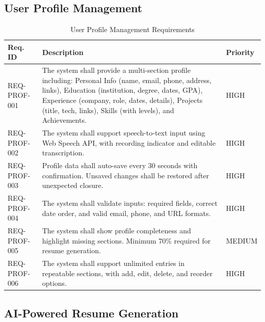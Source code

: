 \documentclass[12pt, a4paper, oneside]{report}
\begin{document}
\subsection{User Profile Management}

\begin{table}[H]
\centering
\caption{User Profile Management Requirements}
\label{tab:req_profile}
\renewcommand{\arraystretch}{1.2}
\small
\begin{tabularx}{\textwidth}{|p{3cm}|X|p{2cm}|}
\hline
\textbf{Req. ID} & \textbf{Description} & \textbf{Priority} \\
\hline
REQ-PROF-001 & The system shall provide a multi-section profile including: Personal Info (name, email, phone, address, links), Education (institution, degree, dates, GPA), Experience (company, role, dates, details), Projects (title, tech, links), Skills (with levels), and Achievements. & HIGH \\
\hline
REQ-PROF-002 & The system shall support speech-to-text input \cite{sears2003} using Web Speech API, with recording indicator and editable transcription. & HIGH \\
\hline
REQ-PROF-003 & Profile data shall auto-save every 30 seconds with confirmation. Unsaved changes shall be restored after unexpected closure. & HIGH \\
\hline
REQ-PROF-004 & The system shall validate inputs: required fields, correct date order, and valid email, phone, and URL formats. & HIGH \\
\hline
REQ-PROF-005 & The system shall show profile completeness and highlight missing sections. Minimum 70\% required for resume generation. & MEDIUM \\
\hline
REQ-PROF-006 & The system shall support unlimited entries in repeatable sections, with add, edit, delete, and reorder options. & HIGH \\
\hline
\end{tabularx}
\end{table}

\subsection{AI-Powered Resume Generation}
\end{document}
